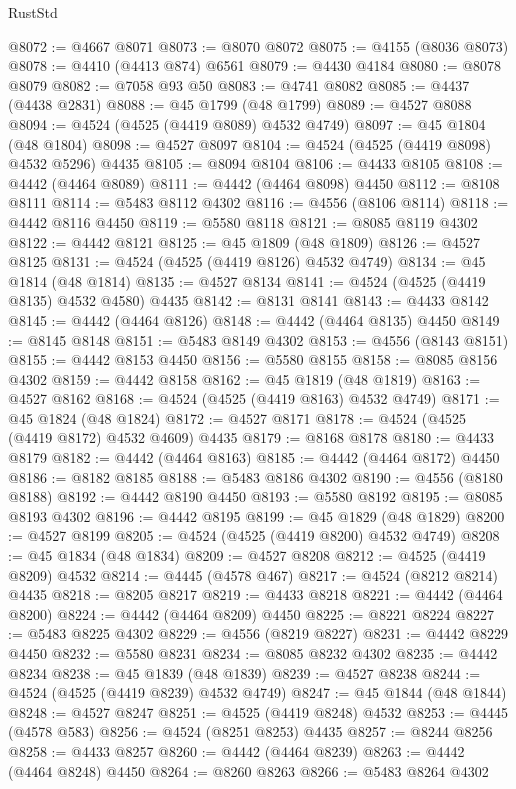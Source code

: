\begin{lexlean}{RustStd}
\begin{coremodule}
@8072 := @4667 @8071
@8073 := @8070 @8072
@8075 := @4155 (@8036 @8073)
@8078 := @4410 (@4413 @874) @6561
@8079 := @4430 @4184
@8080 := @8078 @8079
@8082 := @7058 @93 @50
@8083 := @4741 @8082
@8085 := @4437 (@4438 @2831)
@8088 := @45 @1799 (@48 @1799)
@8089 := @4527 @8088
@8094 := @4524 (@4525 (@4419 @8089) @4532 @4749)
@8097 := @45 @1804 (@48 @1804)
@8098 := @4527 @8097
@8104 := @4524 (@4525 (@4419 @8098) @4532 @5296) @4435
@8105 := @8094 @8104
@8106 := @4433 @8105
@8108 := @4442 (@4464 @8089)
@8111 := @4442 (@4464 @8098) @4450
@8112 := @8108 @8111
@8114 := @5483 @8112 @4302
@8116 := @4556 (@8106 @8114)
@8118 := @4442 @8116 @4450
@8119 := @5580 @8118
@8121 := @8085 @8119 @4302
@8122 := @4442 @8121
@8125 := @45 @1809 (@48 @1809)
@8126 := @4527 @8125
@8131 := @4524 (@4525 (@4419 @8126) @4532 @4749)
@8134 := @45 @1814 (@48 @1814)
@8135 := @4527 @8134
@8141 := @4524 (@4525 (@4419 @8135) @4532 @4580) @4435
@8142 := @8131 @8141
@8143 := @4433 @8142
@8145 := @4442 (@4464 @8126)
@8148 := @4442 (@4464 @8135) @4450
@8149 := @8145 @8148
@8151 := @5483 @8149 @4302
@8153 := @4556 (@8143 @8151)
@8155 := @4442 @8153 @4450
@8156 := @5580 @8155
@8158 := @8085 @8156 @4302
@8159 := @4442 @8158
@8162 := @45 @1819 (@48 @1819)
@8163 := @4527 @8162
@8168 := @4524 (@4525 (@4419 @8163) @4532 @4749)
@8171 := @45 @1824 (@48 @1824)
@8172 := @4527 @8171
@8178 := @4524 (@4525 (@4419 @8172) @4532 @4609) @4435
@8179 := @8168 @8178
@8180 := @4433 @8179
@8182 := @4442 (@4464 @8163)
@8185 := @4442 (@4464 @8172) @4450
@8186 := @8182 @8185
@8188 := @5483 @8186 @4302
@8190 := @4556 (@8180 @8188)
@8192 := @4442 @8190 @4450
@8193 := @5580 @8192
@8195 := @8085 @8193 @4302
@8196 := @4442 @8195
@8199 := @45 @1829 (@48 @1829)
@8200 := @4527 @8199
@8205 := @4524 (@4525 (@4419 @8200) @4532 @4749)
@8208 := @45 @1834 (@48 @1834)
@8209 := @4527 @8208
@8212 := @4525 (@4419 @8209) @4532
@8214 := @4445 (@4578 @467)
@8217 := @4524 (@8212 @8214) @4435
@8218 := @8205 @8217
@8219 := @4433 @8218
@8221 := @4442 (@4464 @8200)
@8224 := @4442 (@4464 @8209) @4450
@8225 := @8221 @8224
@8227 := @5483 @8225 @4302
@8229 := @4556 (@8219 @8227)
@8231 := @4442 @8229 @4450
@8232 := @5580 @8231
@8234 := @8085 @8232 @4302
@8235 := @4442 @8234
@8238 := @45 @1839 (@48 @1839)
@8239 := @4527 @8238
@8244 := @4524 (@4525 (@4419 @8239) @4532 @4749)
@8247 := @45 @1844 (@48 @1844)
@8248 := @4527 @8247
@8251 := @4525 (@4419 @8248) @4532
@8253 := @4445 (@4578 @583)
@8256 := @4524 (@8251 @8253) @4435
@8257 := @8244 @8256
@8258 := @4433 @8257
@8260 := @4442 (@4464 @8239)
@8263 := @4442 (@4464 @8248) @4450
@8264 := @8260 @8263
@8266 := @5483 @8264 @4302

\end{coremodule}
\end{lexlean}
